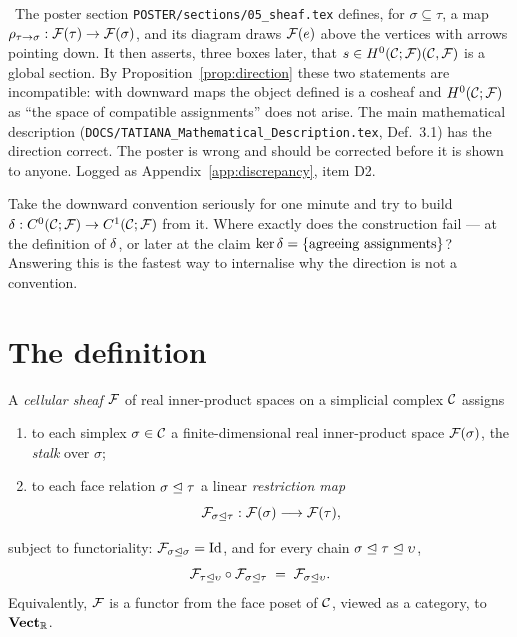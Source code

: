 \begin{hon}\Hon
\Refuted\ The poster section \texttt{POSTER/sections/05\_sheaf.tex}
defines, for $\sigma\subseteq\tau$, a map
$\rho_{\tau\to\sigma}:\mathcal{F}(\tau)\to\mathcal{F}(\sigma)$, and its diagram
draws $\mathcal{F}(e)$ above the vertices with arrows pointing down. It then
asserts, three boxes later, that $s\in H^{0}(\mathcal{C};\mathcal{F})(\mathcal{C},\mathcal{F})$ is a global
section. By Proposition~\ref{prop:direction} these two statements are
incompatible: with downward maps the object defined is a cosheaf and
$H^{0}(\mathcal{C};\mathcal{F})$ as ``the space of compatible assignments'' does not arise. The
main mathematical description
(\texttt{DOCS/TATIANA\_Mathematical\_Description.tex}, Def.~3.1) has the
direction correct. The poster is wrong and should be corrected before it
is shown to anyone. Logged as Appendix~\ref{app:discrepancy}, item D2.
\end{hon}

\begin{exercise}
Take the downward convention seriously for one minute and try to build
$\delta:C^{0}(\mathcal{C};\mathcal{F})\to C^{1}(\mathcal{C};\mathcal{F})$ from it. Where exactly does the construction
fail --- at the definition of $\delta$, or later at the claim
$\ker\delta=\{\text{agreeing assignments}\}$? Answering this is the
fastest way to internalise why the direction is not a convention.
\end{exercise}

\section{The definition}

\begin{definition}\label{def:sheaf}
A \emph{cellular sheaf} $\mathcal{F}$ of real inner-product spaces on a
simplicial complex $\mathcal{C}$ assigns
\begin{enumerate}[label=(\roman*)]
  \item to each simplex $\sigma\in\mathcal{C}$ a finite-dimensional real
        inner-product space $\mathcal{F}(\sigma)$, the \emph{stalk} over
        $\sigma$;
  \item to each face relation $\sigma\trianglelefteq\tau$ a linear
        \emph{restriction map}
        \[
          \mathcal{F}_{\sigma\trianglelefteq\tau}:\mathcal{F}(\sigma)\longrightarrow\mathcal{F}(\tau),
        \]
\end{enumerate}
subject to functoriality: $\mathcal{F}_{\sigma\trianglelefteq\sigma}=\mathrm{Id}$, and for every
chain $\sigma\trianglelefteq\tau\trianglelefteq\upsilon$,
\begin{equation}\label{eq:functoriality}
  \mathcal{F}_{\tau\trianglelefteq\upsilon}\circ\mathcal{F}_{\sigma\trianglelefteq\tau}
  \;=\;\mathcal{F}_{\sigma\trianglelefteq\upsilon}.
\end{equation}
Equivalently, $\mathcal{F}$ is a functor from the face poset of $\mathcal{C}$, viewed as
a category, to $\mathbf{Vect}_{\mathbb{R}}$.
\end{definition}

